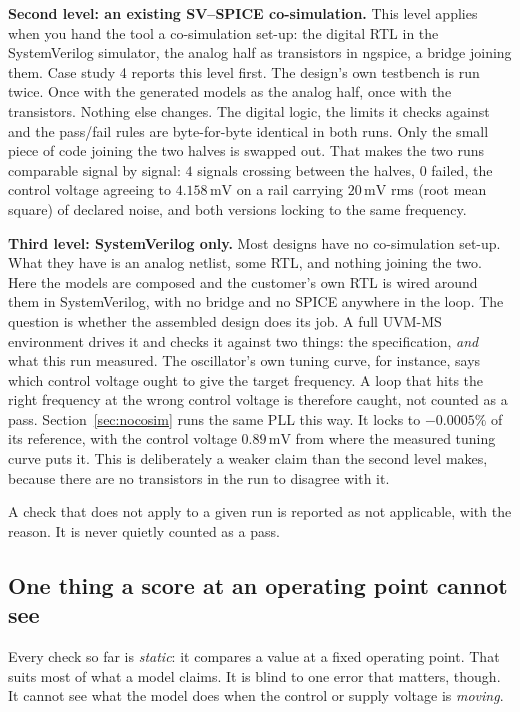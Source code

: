 \documentclass[11pt,a4paper]{article}
\newcommand{\unit}[1]{\,\textrm{#1}}
\begin{document}
\textbf{Second level: an existing SV--SPICE co-simulation.} This level
applies when you hand the tool a co-simulation set-up: the digital RTL
in the SystemVerilog simulator, the analog half as transistors in
ngspice, a bridge joining them. Case study 4 reports this level first.
The design's own testbench is run twice. Once with the generated
models as the analog half, once with the transistors. Nothing else
changes. The digital logic, the limits it checks against and the
pass/fail rules are byte-for-byte identical in both runs. Only the
small piece of code joining the two halves is swapped out. That makes
the two runs comparable signal by signal: $4$ signals crossing between
the halves, $0$ failed, the control voltage agreeing to
$4.158\unit{mV}$ on a rail carrying $20\unit{mV}$ rms (root mean
square) of declared noise, and both versions locking to the same
frequency.

\textbf{Third level: SystemVerilog only.} Most designs have no
co-simulation set-up. What they have is an analog netlist, some RTL,
and nothing joining the two. Here the models are composed and the
customer's own RTL is wired around them in SystemVerilog, with no
bridge and no SPICE anywhere in the loop. The question is whether the
assembled design does its job. A full UVM-MS environment drives it and
checks it against two things: the specification, \emph{and} what this
run measured. The oscillator's own tuning curve, for instance, says
which control voltage ought to give the target frequency. A loop that
hits the right frequency at the wrong control voltage is therefore
caught, not counted as a pass. Section~\ref{sec:nocosim} runs the same
PLL this way. It locks to $-0.0005\%$ of its reference, with the
control voltage $0.89\unit{mV}$ from where the measured tuning curve
puts it. This is deliberately a weaker claim than the second level
makes, because there are no transistors in the run to disagree with
it.

A check that does not apply to a given run is reported as not
applicable, with the reason. It is never quietly counted as a pass.

\subsection{One thing a score at an operating point cannot see}
\label{sec:jitter}

Every check so far is \emph{static}: it compares a value at a fixed
operating point. That suits most of what a model claims. It is blind
to one error that matters, though. It cannot see what the model does
when the control or supply voltage is \emph{moving}.
\end{document}
